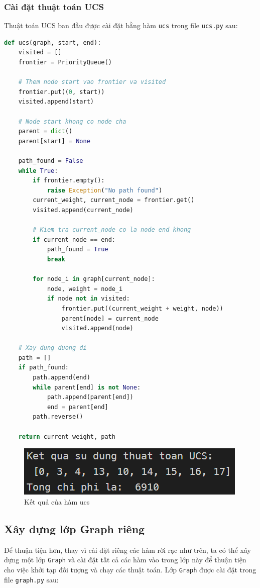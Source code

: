 \documentclass[a4paper, 11pt]{article}
\begin{document}
\subsubsection{Cài đặt thuật toán UCS}
Thuật toán UCS ban đầu được cài đặt bằng hàm \lstinline{ucs} trong file \lstinline{ucs.py} sau:
\begin{lstlisting}[language=Python]
def ucs(graph, start, end):
    visited = []
    frontier = PriorityQueue()

    # Them node start vao frontier va visited
    frontier.put((0, start))
    visited.append(start)

    # Node start khong co node cha
    parent = dict()
    parent[start] = None

    path_found = False
    while True:
        if frontier.empty():
            raise Exception("No path found")
        current_weight, current_node = frontier.get()
        visited.append(current_node)

        # Kiem tra current_node co la node end khong
        if current_node == end:
            path_found = True
            break

        for node_i in graph[current_node]:
            node, weight = node_i
            if node not in visited:
                frontier.put((current_weight + weight, node))
                parent[node] = current_node
                visited.append(node)

    # Xay dung duong di
    path = []
    if path_found:
        path.append(end)
        while parent[end] is not None:
            path.append(parent[end])
            end = parent[end]
        path.reverse()
    
    return current_weight, path
\end{lstlisting}

\begin{figure}[h]
    \centering
    \includegraphics[]{ucs_func.png}
    \caption{Kết quả của hàm ucs}
\end{figure}

\subsection{Xây dựng lớp Graph riêng}
Để thuận tiện hơn, thay vì cài đặt riêng các hàm rời rạc như trên, ta có thể xây dựng một lớp \lstinline{Graph} và cài đặt tất cả các hàm vào trong lớp này để thuận tiện cho việc khởi tạp đối tượng và chạy các thuật toán. Lớp \lstinline{Graph} được cài đặt trong file \lstinline{graph.py} sau:
\end{document}
